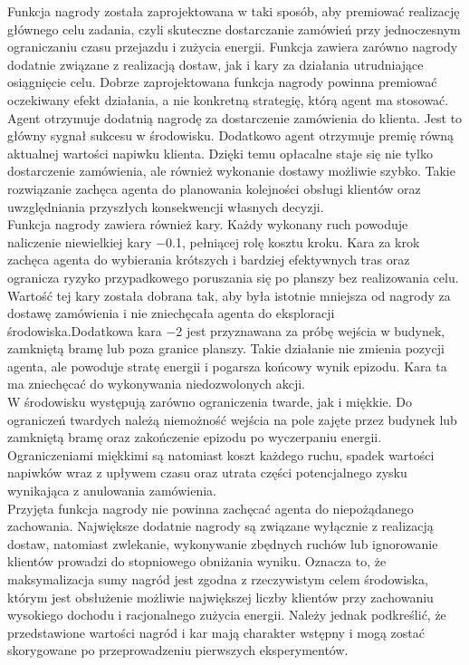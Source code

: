 \documentclass[12pt]{article}
\begin{document}
Funkcja nagrody została zaprojektowana w taki sposób, aby premiować realizację głównego celu zadania, czyli skuteczne dostarczanie zamówień przy jednoczesnym ograniczaniu czasu przejazdu i zużycia energii. Funkcja zawiera zarówno nagrody dodatnie związane z realizacją dostaw, jak i kary za działania utrudniające osiągnięcie celu. Dobrze zaprojektowana funkcja nagrody powinna premiować oczekiwany efekt działania, a nie konkretną strategię, którą agent ma stosować.
\\Agent otrzymuje dodatnią nagrodę za dostarczenie zamówienia do klienta. Jest to główny sygnał sukcesu w środowisku. Dodatkowo agent otrzymuje premię równą aktualnej wartości napiwku klienta. Dzięki temu opłacalne staje się nie tylko dostarczenie zamówienia, ale również wykonanie dostawy możliwie szybko. Takie rozwiązanie zachęca agenta do planowania kolejności obsługi klientów oraz uwzględniania przyszłych konsekwencji własnych decyzji.
\\Funkcja nagrody zawiera również kary. Każdy wykonany ruch powoduje naliczenie niewielkiej kary −0.1, pełniącej rolę kosztu kroku. Kara za krok zachęca agenta do wybierania krótszych i bardziej efektywnych tras oraz ogranicza ryzyko przypadkowego poruszania się po planszy bez realizowania celu. Wartość tej kary została dobrana tak, aby była istotnie mniejsza od nagrody za dostawę zamówienia i nie zniechęcała agenta do eksploracji środowiska.Dodatkowa kara −2 jest przyznawana za próbę wejścia w budynek, zamkniętą bramę lub poza granice planszy. Takie działanie nie zmienia pozycji agenta, ale powoduje stratę energii i pogarsza końcowy wynik epizodu. Kara ta ma zniechęcać do wykonywania niedozwolonych akcji.
\\W środowisku występują zarówno ograniczenia twarde, jak i miękkie. Do ograniczeń twardych należą niemożność wejścia na pole zajęte przez budynek lub zamkniętą bramę oraz zakończenie epizodu po wyczerpaniu energii. Ograniczeniami miękkimi są natomiast koszt każdego ruchu, spadek wartości napiwków wraz z upływem czasu oraz utrata części potencjalnego zysku wynikająca z anulowania zamówienia.
\\Przyjęta funkcja nagrody nie powinna zachęcać agenta do niepożądanego zachowania. Największe dodatnie nagrody są związane wyłącznie z realizacją dostaw, natomiast zwlekanie, wykonywanie zbędnych ruchów lub ignorowanie klientów prowadzi do stopniowego obniżania wyniku. Oznacza to, że maksymalizacja sumy nagród jest zgodna z rzeczywistym celem środowiska, którym jest obsłużenie możliwie największej liczby klientów przy zachowaniu wysokiego dochodu i racjonalnego zużycia energii. Należy jednak podkreślić, że przedstawione wartości nagród i kar mają charakter wstępny i mogą zostać skorygowane po przeprowadzeniu pierwszych eksperymentów.
\end{document}
